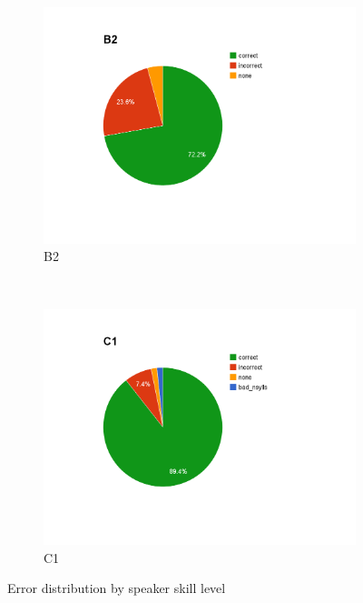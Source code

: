 \begin{figure}[htb]
				\begin{subfigure}[b]{0.5\textwidth}
					\includegraphics[width=\textwidth]{img/annotation/B2}
					\caption{B2}
					\label{fig:levelpies:B2}
				\end{subfigure}%
				~
				\begin{subfigure}[b]{0.5\textwidth}
					\includegraphics[width=\textwidth]{img/annotation/C1}
					\caption{C1}
					\label{fig:levelpies:C1}
				\end{subfigure}%
				\caption{Error distribution by speaker skill level}
				\label{fig:levelpies}
			\end{figure}		
			
			
			
